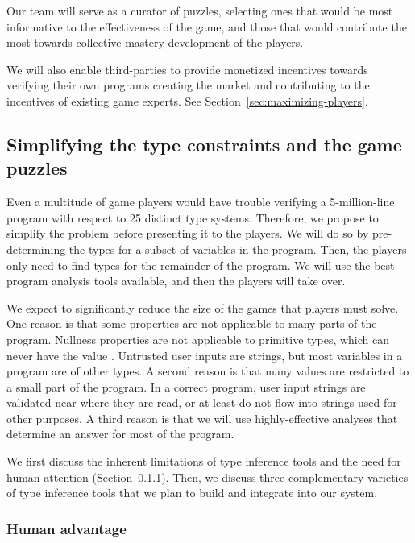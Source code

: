 \documentclass{sig-alternate}
\def\<#1>{\codeid{#1}}
\newcommand{\codeid}[1]{\ifmmode{\mbox{\ttfamily{#1}}}\else{\ttfamily #1}\fi}
\begin{document}
Our team will serve as a curator of puzzles, selecting ones that
would be most informative to the effectiveness of the game, and
those that would contribute the most towards collective mastery
development of the players.

We will also enable third-parties to provide monetized incentives
towards verifying their own programs creating the market and
contributing to the incentives of existing game experts.
See Section~\ref{sec:maximizing-players}.


\subsection{Simplifying the type constraints and the game puzzles}
\label{sec:simplification}

Even a multitude of game players would have trouble verifying a
5-million-line program with respect to 25 distinct type systems.
Therefore, we propose to simplify the problem before presenting it to the
players.  We will do so by pre-determining the types for a subset of
variables in the program.  Then, the players only need to find types for
the remainder of the program.  We will use the best program analysis tools
available, and then the players will take over.

We expect to significantly reduce the size of the games that players must
solve.  One reason is that some properties are not applicable to many parts
of the program.  Nullness properties are not applicable to primitive types,
which can never have the value \<null>.  Untrusted user inputs are strings,
but most variables in a program are of other types.  A second reason is
that many values are restricted to a small part of the program.  In a
correct program, user input strings are validated near where they are read,
or at least do not flow into strings used for other purposes.  A third
reason is that we will use highly-effective analyses that determine an
answer for most of the program.

We first discuss the inherent limitations of type inference tools and the
need for human attention (Section~\ref{sec:human-advantage}).  Then, we
discuss three complementary varieties of type inference tools that we plan
to build and integrate into our system.




\subsubsection{Human advantage}
\label{sec:human-advantage}
\end{document}
